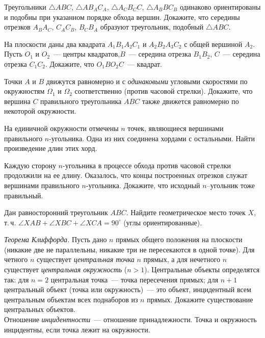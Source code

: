 \begin{problems}

\item
Треугольники
$\triangle A B C$,
$\triangle A B_A C_A$,
$\triangle A_C B_C C$,
$\triangle A_B B C_B$
одинаково ориентированы и подобны при указанном порядке обхода вершин.
Докажите, что середины отрезков
$A_B A_C$, $C_A C_B$, $B_C B_A$ образуют треугольник, подобный $\triangle ABC$.

\item
На плоскости даны два квадрата $A_1 B_1 A_2 C_1$ и $A_2 B_2 A_3 C_2$ с общей
вершиной $A_2$.
Пусть $O_1$ и $O_2$~--- центры квадратов,$B$~--- середина отрезка $B_1 B_2$,
$C$~--- середина отрезка $C_1 C_2$.
Докажите, что $O_1 B O_2 C$~--- квадрат.

\item
Точки $A$ и $B$ движутся равномерно и с \emph{одинаковыми} угловыми скоростями
по окружностям $\Omega_1$ и $\Omega_2$ соответственно (против часовой стрелки).
Докажите, что вершина $C$ правильного треугольника $ABC$ также движется
равномерно по некоторой окружности.

\item
На единичной окружности отмечены $n$ точек, являющиеся вершинами правильного
$n$-угольника.
Одна из них соединена хордами с остальными.
Найти произведение длин этих хорд.

\item
Каждую сторону $n$-угольника в процессе обхода против часовой стрелки
продолжили на ее длину.
Оказалось, что концы построенных отрезков служат вершинами правильного
$n$-угольника.
Докажите, что исходный $n$--угольник тоже правильный.

\itemx{*}
Дан равносторонний треугольник $ABC$.
Найдите геометрическое место точек $X$, т.\,ч.
$\angle XAB + \angle XBC + \angle XCA = 90^{\circ}$
(углы ориентированные).

\itemx{*}
\emph{Теорема Клиффорда.}
Пусть дано $n$ прямых общего положения на плоскости
(никакие две не параллельны, никакие три не пересекаются в одной точке).
Для четного $n$ существует \emph{центральная точка} $n$ прямых, а для нечетного
$n$ существует \emph{центральная окружность} ($n > 1$).
Центральные объекты определятся так: для $n = 2$ центральная точка~--- точка
пересечения прямых; для $n + 1$ центральный объект (точка или окружность)~---
это объект, инцидентный всем центральным объектам всех поднаборов из $n$
прямых.
Докажите существование центральных объектов.
\\
Отношение \emph{инцидентности}~--- отношение принадлежности.
Точка и окружность инцидентны, если точка лежит на окружности.

\end{problems}

